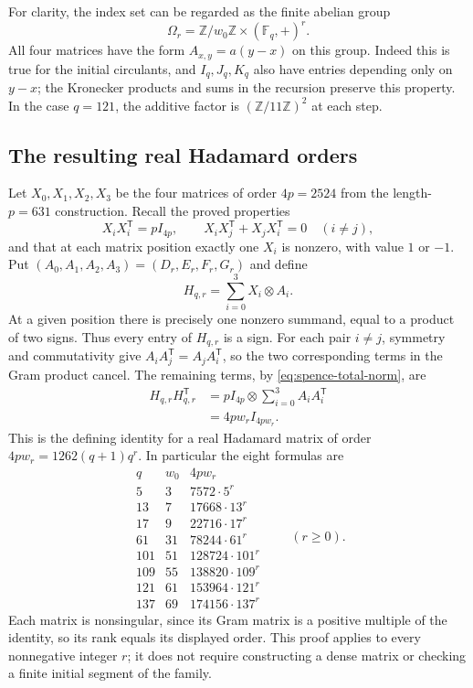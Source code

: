 \documentclass[10pt]{article}
\begin{document}
For clarity, the index set can be regarded as the finite abelian group
\[
 \Omega_r=\mathbb Z/w_0\mathbb Z\times(\mathbb F_q,+)^r.
\]
All four matrices have the form $A_{x,y}=a(y-x)$ on this group.
Indeed this is true for the initial circulants, and $I_q,J_q,K_q$ also
have entries depending only on $y-x$; the Kronecker products and sums in
the recursion preserve this property. In the case $q=121$, the additive
factor is $(\mathbb Z/11\mathbb Z)^2$ at each step.

\subsection{The resulting real Hadamard orders}

Let $X_0,X_1,X_2,X_3$ be the four matrices of order $4p=2524$ from the
length-$p=631$ construction. Recall the proved properties
\[
 X_iX_i^{\mathsf T}=pI_{4p},\qquad
 X_iX_j^{\mathsf T}+X_jX_i^{\mathsf T}=0\quad(i\ne j),
\]
and that at each matrix position exactly one $X_i$ is nonzero, with value
$1$ or $-1$. Put $(A_0,A_1,A_2,A_3)=(D_r,E_r,F_r,G_r)$ and define
\[
 H_{q,r}=\sum_{i=0}^3X_i\otimes A_i.
\]
At a given position there is precisely one nonzero summand, equal to a
product of two signs. Thus every entry of $H_{q,r}$ is a sign. For each
pair $i\ne j$, symmetry and commutativity give
$A_iA_j^{\mathsf T}=A_jA_i^{\mathsf T}$, so the two corresponding terms
in the Gram product cancel. The remaining terms, by
\eqref{eq:spence-total-norm}, are
\[
 \begin{split}
 H_{q,r}H_{q,r}^{\mathsf T}
 &=pI_{4p}\otimes\sum_{i=0}^3A_iA_i^{\mathsf T}\\
 &=4pw_rI_{4pw_r}.
 \end{split}
\]
This is the defining identity for a real Hadamard matrix of order
$4pw_r=1262(q+1)q^r$. In particular the eight formulas are
\[
\begin{array}{c|r|l}
 q&w_0&4pw_r\\\hline
 5&3&7572\cdot5^r\\
 13&7&17668\cdot13^r\\
 17&9&22716\cdot17^r\\
 61&31&78244\cdot61^r\\
 101&51&128724\cdot101^r\\
 109&55&138820\cdot109^r\\
 121&61&153964\cdot121^r\\
 137&69&174156\cdot137^r
\end{array}
\qquad(r\geq0).
\]
Each matrix is nonsingular, since its Gram matrix is a positive multiple
of the identity, so its rank equals its displayed order. This proof applies
to every nonnegative integer $r$; it does not require constructing a dense
matrix or checking a finite initial segment of the family.
\end{document}
